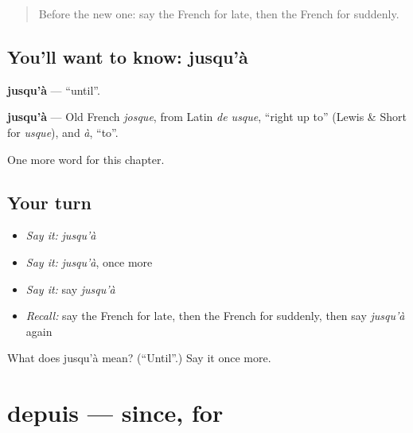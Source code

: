 \label{lesson:FR-C187-jusqua}



\begin{quote}
Before the new one: say the French for late, then the French for suddenly.
\end{quote}

\subsection*{You'll want to know: jusqu'à}
\textbf{jusqu'à} — \textquotedblleft{}until\textquotedblright{}.

\begin{cousinweb}
\textbf{jusqu'à} — Old French \emph{josque}, from Latin \emph{de usque}, \textquotedblleft{}right up to\textquotedblright{} (Lewis \& Short for \emph{usque}), and \emph{à}, \textquotedblleft{}to\textquotedblright{}.
\end{cousinweb}

\begin{grammarlens}[title={What you've built}]
One more word for this chapter.
\end{grammarlens}

\subsection*{Your turn}
\begin{itemize}
\raggedright
  \item \emph{Say it:} \emph{jusqu'à}
  \item \emph{Say it:} \emph{jusqu'à}, once more
  \item \emph{Say it:} say \emph{jusqu'à}
  \item \emph{Recall:} say the French for late, then the French for suddenly, then say \emph{jusqu'à} again
\end{itemize}

\begin{tcolorbox}[breakable,colback=teal!4,colframe=teal!35!black,title={Before you move on}]
What does jusqu'à mean? (\textquotedblleft{}Until\textquotedblright{}.) Say it once more.
\end{tcolorbox}
\section[depuis]{depuis — since, for}

\label{lesson:FR-C187-depuis}



